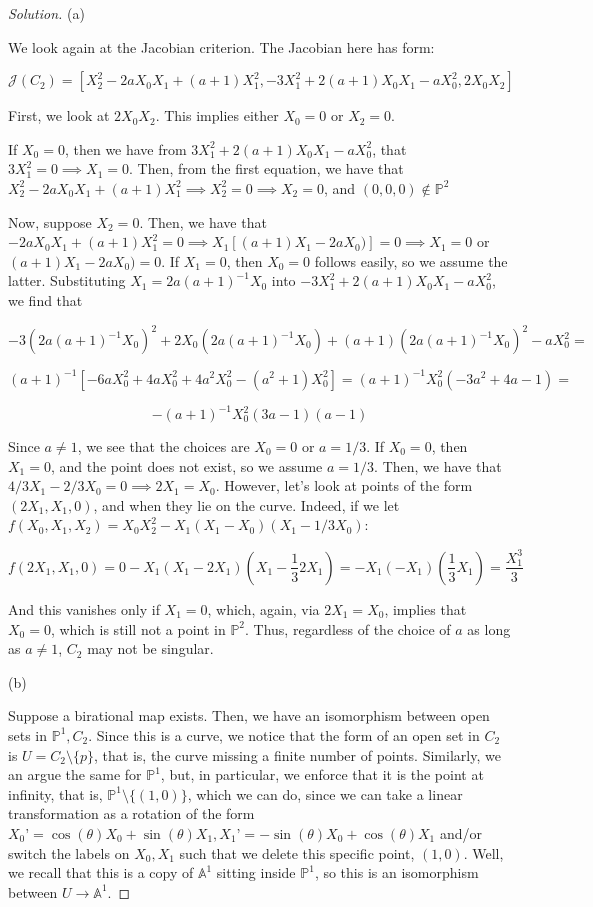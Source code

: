 \documentclass[10pt]{article}
\begin{document}
\begin{proof}[Solution]

(a)

We look again at the Jacobian criterion. The Jacobian here has form:

$$\mathcal{J}(C_2) = [ X_2^2 - 2aX_0X_1 + (a+1)X_1^2, -3X_1^2 + 2(a+1)X_0X_1 - aX_0^2, 2X_0X_2 ]$$

First, we look at $2X_0X_2$. This implies either $X_0 = 0$ or $X_2 = 0$. 

If $X_0 = 0$, then we have from $3X_1^2 + 2(a+1)X_0X_1 - aX_0^2$, that $3X_1^2 = 0 \implies X_1 = 0$. Then, from the first equation, we have that $X_2^2 - 2aX_0X_1 + (a+1)X_1^2 \implies X_2^2 = 0 \implies X_2 = 0$, and $(0,0,0) \not \in \mathbb{P}^2$

Now, suppose $X_2 = 0$. Then, we have that $-2aX_0X_1 + (a+1)X_1^2 = 0 \implies X_1[(a+1)X_1 - 2aX_0)] = 0 \implies X_1 = 0$ or $(a+1)X_1 - 2aX_0) = 0$. If $X_1 = 0$, then $X_0 = 0$ follows easily, so we assume the latter. Substituting $X_1 = 2a(a+1)^{-1}X_0$ into $-3X_1^2 + 2(a+1)X_0X_1 - aX_0^2$, we find that 

$$ -3(2a(a+1)^{-1}X_0 )^2 + 2X_0(2a(a+1)^{-1}X_0 ) + (a+1)(2a(a+1)^{-1}X_0 )^2- aX_0^2 =$$

$$ (a+1)^{-1} [ -6a X_0^2 + 4aX_0^2 + 4a^2 X_0^2 - (a^2 + 1)X_0^2] = (a+1)^{-1} X_0^2 (-3a^2 + 4a -1)=  $$

$$  -(a+1)^{-1} X_0^2 (3a - 1)(a-1)$$

Since $a \not = 1$, we see that the choices are $X_0 = 0$ or $a = 1/3$. If $X_0 = 0$, then $X_1 = 0$, and the point does not exist, so we assume $a = 1/3$. Then, we have that $4/3X_1 - 2/3X_0 = 0 \implies 2X_1 = X_0$. However, let’s look at points of the form $(2X_1,X_1, 0)$, and when they lie on the curve. Indeed, if we let $f(X_0,X_1,X_2) = X_0X_2^2 - X_1(X_1 - X_0)(X_1 - 1/3X_0)$:

$$ f(2X_1,X_1,0) = 0 - X_1(X_1 - 2X_1)\left(X_1 - \frac{1}{3} 2X_1\right) = -X_1(-X_1)\left(\frac{1}{3} X_1\right) = \frac{X_1^3}{3} $$

And this vanishes only if $X_1 = 0$, which, again, via $2X_1= X_0$, implies that $X_0 = 0$, which is still not a point in $\mathbb{P}^2$. Thus, regardless of the choice of $a$ as long as $a \not = 1$, $C_2$ may not be singular.

(b)

Suppose a birational map exists. Then, we have an isomorphism between open sets in $\mathbb{P}^1, C_2$. Since this is a curve, we notice that the form of an open set in $C_2$ is $U = C_2 \setminus \{p \}$, that is, the curve missing a finite number of points. Similarly, we an argue the same for $\mathbb{P}^1$, but, in particular, we enforce that it is the point at infinity, that is, $\mathbb{P}^1 \setminus \{ (1,0) \}$, which we can do, since we can take a linear transformation as a rotation of the form $X_0’ = \cos(\theta)X_0 + \sin(\theta) X_1, X_1’ =  -\sin(\theta)X_0+ \cos(\theta) X_1$ and/or switch the labels on $X_0,X_1$ such that we delete this specific point, $(1,0)$. Well, we recall that this is a copy of $\mathbb{A}^1$ sitting inside $\mathbb{P}^1$, so this is an isomorphism between $U \to \mathbb{A}^1$.


\end{proof}
\end{document}
